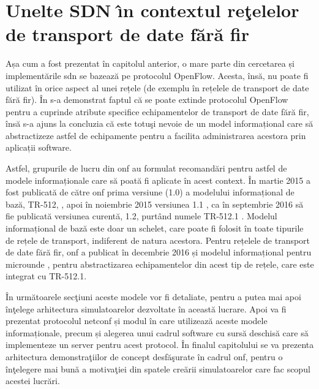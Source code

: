 \chapter{Unelte SDN \^{\i}n contextul reţelelor de transport de date fără fir\label{ch:sdn_in_contextul_wt}}

\graphicspath{ {cap-sdn_in_contextul_wt/figures/} }

Așa cum a fost prezentat în capitolul anterior, o mare parte din cercetarea și implementările \gls{sdn} se bazează pe protocolul OpenFlow. Acesta, însă, nu poate fi utilizat în orice aspect al unei rețele (de exemplu în rețelele de transport de date fără fir). În \cite{onf2015_poc1} s-a demonstrat faptul că se poate extinde protocolul OpenFlow pentru a cuprinde atribute specifice echipamentelor de transport de date fără fir, însă s-a ajuns la concluzia că este totuşi nevoie de un model informațional care să abstractizeze astfel de echipamente pentru a facilita administrarea acestora prin aplicații software. 

Astfel, grupurile de lucru din \gls{onf} au formulat recomandări pentru astfel de modele informaționale care să poată fi aplicate în acest context. În martie 2015 a fost publicată de către \gls{onf} prima versiune (1.0) a modelului informațional de bază, TR-512, \cite{onftr512v1.0}, apoi în noiembrie 2015 versiunea 1.1 \cite{onftr512v1.1}, ca în septembrie 2016 să fie publicată versiunea curentă, 1.2, purtând numele TR-512.1 \cite{onftr512v1.2}. Modelul informațional de bază este doar un schelet, care poate fi folosit în toate tipurile de rețele de transport, indiferent de natura acestora. Pentru rețelele de transport de date fără fir, \gls{onf} a publicat în decembrie 2016 și modelul informațional pentru microunde \cite{onftr532}, pentru abstractizarea echipamentelor din acest tip de rețele, care este integrat cu TR-512.1. 

În următoarele secţiuni aceste modele vor fi detaliate, pentru a putea mai apoi înţelege arhitectura simulatoarelor dezvoltate în această lucrare. Apoi va fi prezentat protocolul \gls{netconf} și modul în care utilizează aceste modele informaționale, precum și alegerea unui cadrul software cu sursă deschisă care să implementeze un server pentru acest protocol. În finalul capitolului se va prezenta arhitectura demonstraţiilor de concept desfăşurate în cadrul \gls{onf}, pentru o înţelegere mai bună a motivaţiei din spatele creării simulatoarelor care fac scopul acestei lucrări.






